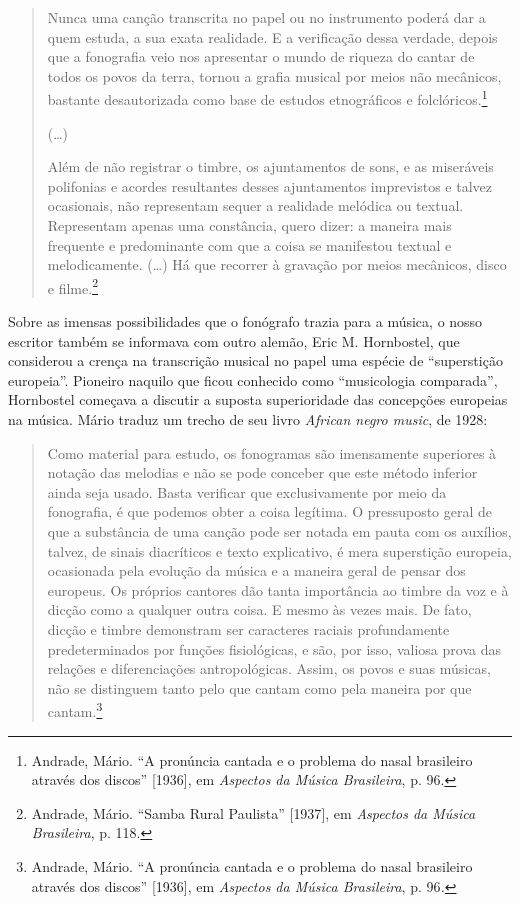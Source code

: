 \begin{quote}
Nunca uma canção transcrita no papel ou no instrumento poderá dar a quem
estuda, a sua exata realidade. E a verificação dessa verdade, depois que
a fonografia veio nos apresentar o mundo de riqueza do cantar de todos
os povos da terra, tornou a grafia musical por meios não mecânicos,
bastante desautorizada como base de estudos etnográficos e
folclóricos.\footnote{Andrade, Mário. ``A pronúncia cantada e o problema
  do nasal brasileiro através dos discos'' {[}1936{]}, em \emph{Aspectos
  da Música Brasileira}, p. 96.}

(\ldots{})

Além de não registrar o timbre, os ajuntamentos de sons, e as miseráveis
polifonias e acordes resultantes desses ajuntamentos imprevistos e
talvez ocasionais, não representam sequer a realidade melódica ou
textual. Representam apenas uma constância, quero dizer: a maneira mais
frequente e predominante com que a coisa se manifestou textual e
melodicamente. (\ldots{}) Há que recorrer à gravação por meios mecânicos,
disco e filme.\footnote{Andrade, Mário. ``Samba Rural Paulista''
  {[}1937{]}, em \emph{Aspectos da Música Brasileira}, p. 118.}
\end{quote}

Sobre as imensas possibilidades que o fonógrafo trazia para a música, o
nosso escritor também se informava com outro alemão, Eric M. Hornbostel,
que considerou a crença na transcrição musical no papel uma espécie de
``superstição europeia''. Pioneiro naquilo que ficou conhecido como
``musicologia comparada'', Hornbostel começava a discutir a suposta
superioridade das concepções europeias na música. Mário traduz um trecho
de seu livro \emph{African negro music}, de 1928:

\begin{quote}
Como material para estudo, os fonogramas são imensamente superiores à
notação das melodias e não se pode conceber que este método inferior
ainda seja usado. Basta verificar que exclusivamente por meio da
fonografia, é que podemos obter a coisa legítima. O pressuposto geral de
que a substância de uma canção pode ser notada em pauta com os auxílios,
talvez, de sinais diacríticos e texto explicativo, é mera superstição
europeia, ocasionada pela evolução da música e a maneira geral de pensar
dos europeus. Os próprios cantores dão tanta importância ao timbre da
voz e à dicção como a qualquer outra coisa. E mesmo às vezes mais. De
fato, dicção e timbre demonstram ser caracteres raciais profundamente
predeterminados por funções fisiológicas, e são, por isso, valiosa prova
das relações e diferenciações antropológicas. Assim, os povos e suas
músicas, não se distinguem tanto pelo que cantam como pela maneira por
que cantam.\footnote{Andrade, Mário. ``A pronúncia cantada e o problema
  do nasal brasileiro através dos discos'' {[}1936{]}, em \emph{Aspectos
  da Música Brasileira}, p. 96\emph{.}}
\end{quote}

